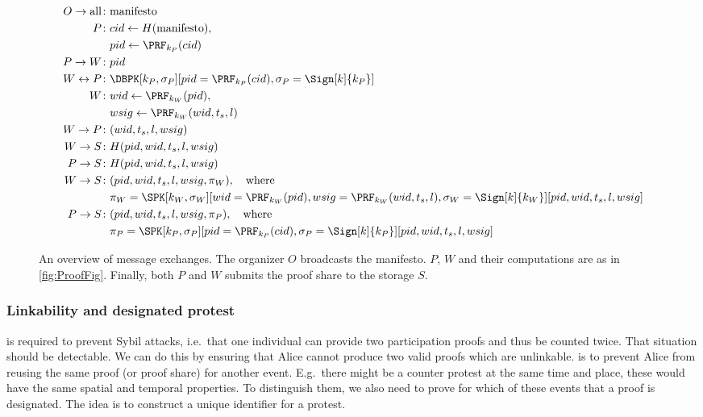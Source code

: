 \begin{figure*}
  \centering
  \begin{minipage}{\linewidth}
    \begin{align*}
      O\to \text{all}\colon & \text{manifesto} \\
      P\colon & cid\gets H(\text{manifesto}), \\
        & pid\gets \PRF_{k_P}(cid) \\
      P\to W\colon & pid \\
      W\leftrightarrow P\colon &
        \DBPK[k_P, \sigma_P][pid = \PRF_{k_P}(cid), \sigma_P = \Sign[k]{k_P}] \\
      W\colon & wid\gets \PRF_{k_W}(pid), \\
        & wsig\gets \PRF_{k_W}(wid, t_s, l) \\
      W\to P\colon & (wid, t_s, l, wsig) \\
      W\to S\colon & H(pid, wid, t_s, l, wsig) \\
      P\to S\colon & H(pid, wid, t_s, l, wsig) \\
      W\to S\colon & (pid, wid, t_s, l, wsig, \pi_W),\quad \text{where}\\
        & \pi_W = \SPK[k_W, \sigma_W]%
          [wid = \PRF_{k_W}(pid), wsig = \PRF_{k_W}(wid, t_s, l), \sigma_W = 
            \Sign[k]{k_W}][pid, wid, t_s, l, wsig] \\
      P\to S\colon & (pid, wid, t_s, l, wsig, \pi_P),\quad \text{where}\\
        & \pi_P = \SPK[k_P, \sigma_P][pid = \PRF_{k_P}(cid), \sigma_P = 
          \Sign[k]{k_P}][pid, wid, t_s, l, wsig]
    \end{align*}
  \end{minipage}
  \caption{%
    An overview of message exchanges.
    The organizer \(O\) broadcasts the manifesto.
    \(P\), \(W\) and their computations are as in \cref{fig:ProofFig}.
    Finally, both \(P\) and \(W\) submits the proof share to the storage \(S\).
  }%
  \label{fig:ProtocolOverview}
\end{figure*}

\subsubsection{Linkability and designated protest}

 is required to prevent Sybil attacks, i.e.\ that one individual 
can provide two participation proofs and thus be counted twice.
That situation should be detectable.
We can do this by ensuring that Alice cannot produce two valid proofs which
are unlinkable.
 is to prevent Alice from reusing the same proof (or proof 
share) for another event.
E.g.\ there might be a counter protest at the same time and place, these would 
have the same spatial and temporal properties.
To distinguish them, we also need to prove for which of these events that a 
proof is designated.
The idea is to construct a unique identifier for a protest.

